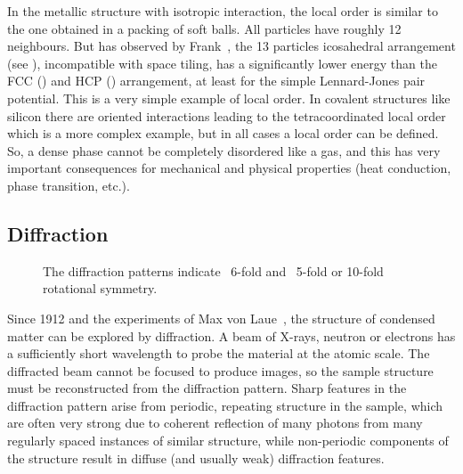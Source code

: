 In the metallic structure with isotropic interaction, the local order is similar to the one obtained in a packing of soft balls. All particles have roughly 12 neighbours. But has observed by Frank~\citep{Frank1952}, the 13 particles icosahedral arrangement (see ), incompatible with space tiling, has a significantly lower energy than the \ac{FCC} () and \ac{HCP} () arrangement, at least for the simple Lennard-Jones pair potential. This is a very simple example of local order. In covalent structures like silicon there are oriented interactions leading to the tetracoordinated local order which is a more complex example, but in all cases a local order can be defined. So, a dense phase cannot be completely disordered like a gas, and this has very important consequences for mechanical and physical properties (heat conduction, phase transition, etc.).

\subsection{Diffraction}
\label{Diffraction}

\begin{figure}
	\centering
	\caption{The diffraction patterns indicate ~6-fold and ~5-fold or 10-fold rotational symmetry.}
	\label{fig:diffraction}
\end{figure}

Since 1912 and the experiments of Max von Laue~\citep{Laue1912}, the structure of condensed matter can be explored by diffraction. A beam of X-rays, neutron or electrons has a sufficiently short wavelength to probe the material at the atomic scale. The diffracted beam cannot be focused to produce images, so the sample structure must be reconstructed from the diffraction pattern. Sharp features in the diffraction pattern arise from periodic, repeating structure in the sample, which are often very strong due to coherent reflection of many photons from many regularly spaced instances of similar structure, while non-periodic components of the structure result in diffuse (and usually weak) diffraction features.

